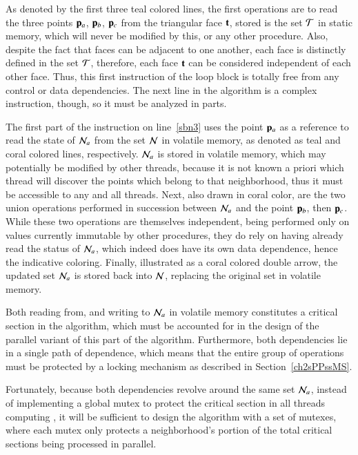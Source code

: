 As denoted by the first three teal colored lines, the first operations are to read the three points $\mathbf{p}_a$, $\mathbf{p}_b$, $\mathbf{p}_c$ from the triangular face $\mathbf{t}$, stored is the set $\mathcal{T}$ in static memory, which will never be modified by this, or any other procedure. Also, despite the fact that faces can be adjacent to one another, each face is distinctly defined in the set $\mathcal{T}$, therefore, each face $\mathbf{t}$ can be considered independent of each other face. Thus, this first instruction of the loop block is totally free from any control or data dependencies. The next line in the algorithm is a complex instruction, though, so it must be analyzed in parts.

The first part of the instruction on line~\ref{sbn3} uses the point $\mathbf{p}_a$ as a reference to read the state of $\mathcal{N}_a$ from the set $\mathcal{N}$ in volatile memory, as denoted as teal and coral colored lines, respectively. $\mathcal{N}_a$ is stored in volatile memory, which may potentially be modified by other threads, because it is not known a priori which thread will discover the points which belong to that neighborhood, thus it must be accessible to any and all threads. Next, also drawn in coral color, are the two union operations performed in succession between $\mathcal{N}_a$ and the point $\mathbf{p}_b$, then $\mathbf{p}_c$. While these two operations are themselves independent, being performed only on values currently immutable by other procedures, they do rely on having already read the status of $\mathcal{N}_a$, which indeed does have its own data dependence, hence the indicative coloring. Finally, illustrated as a coral colored double arrow, the updated set $\mathcal{N}_a$ is stored back into $\mathcal{N}$, replacing the original set in volatile memory.

Both reading from, and writing to $\mathcal{N}_a$ in volatile memory constitutes a critical section in the algorithm, which must be accounted for in the design of the parallel variant of this part of the algorithm. Furthermore, both dependencies lie in a single path of dependence, which means that the entire group of operations must be protected by a locking mechanism as described in Section~\ref{ch2sPPssMS}. 

Fortunately, because both dependencies revolve around the same set $\mathcal{N}_a$, instead of implementing a global mutex to protect the critical section in all threads computing , it will be sufficient to design the algorithm with a set of mutexes, where each mutex only protects a neighborhood's portion of the total critical sections being processed in parallel.

